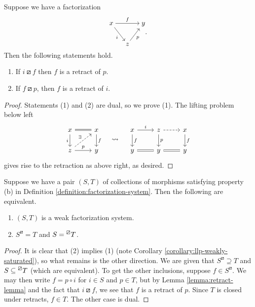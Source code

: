 \begin{lemma}\label{lemma:retract-lemma}
	Suppose we have a factorization
	\[
	\begin{tikzcd}[cramped, column sep=small]
		x\ar[rr,"f"]\ar[dr,"i"'] & & y \\
		& z\ar[ur,"p"'] &
	\end{tikzcd}.
	\]
	Then the following statements hold.
	\begin{enumerate}[label=(\arabic*)]
		\item If \(i\boxslash f\) then \(f\) is a retract of \(p\).
		\item If \(f\boxslash p\), then \(f\) is a retract of \(i\).
	\end{enumerate}
\end{lemma}
\begin{proof}
Statements (1) and (2) are dual, so we prove (1). The lifting problem below left
\[
	\begin{tikzcd}
		x\ar[r,equal]\ar[d,"i"'] & x \ar[d,"f"] \\
		z\ar[r,"p"]\ar[ur,dashed,"\exists"] & y
	\end{tikzcd}\quad\leadsto\quad
	\begin{tikzcd}
		x\ar[d,"f"]\ar[r,"i"] & z\ar[d,"p"]\ar[r,dashed,""] & x \ar[d,"f"] \\
		y \ar[r,equal] & y \ar[r,equal] & y
	\end{tikzcd}
\]
gives rise to the retraction as above right, as desired.
\end{proof}
\begin{proposition}\label{prop:factorization-system-equalities}
	Suppose we have a pair \((S,T)\) of collections of morphisms satisfying property (b) in Definition \ref{definition:factorization-system}. Then the following are equivalent.
	\begin{enumerate}[label=(\arabic*)]
		\item \((S,T)\) is a weak factorization system.
		\item \(S^\boxslash = T\) and \(S = \prescript{\boxslash}{}{T}\).
	\end{enumerate}
\end{proposition}
\begin{proof}
It is clear that (2) implies (1) (note Corollary \ref{corollary:llp-weakly-saturated}), so what remains is the other direction. We are given that \(S^\boxslash \supseteq T\) and \(S\subseteq \prescript{\boxslash}{}{T}\)
(which are equivalent). To get the other inclusions, suppose \(f\in S^\boxslash\). We may then write \(f = p\circ i\) for \(i\in S\) and \(p\in T\), but by Lemma \ref{lemma:retract-lemma} and the
fact that \(i\boxslash f\), we see that \(f\) is a retract of \(p\). Since \(T\) is closed under retracts, \(f \in T\). The other case is dual.
\end{proof}


